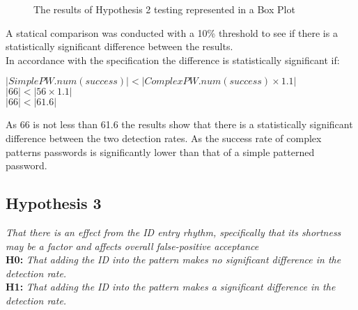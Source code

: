 \documentclass{article}
\begin{document}
\begin{figure} [H]
    \centering
    \caption{The results of Hypothesis 2 testing represented in a Box Plot}
    \label{fig:boxPlotHyp2}
\end{figure}

A statical comparison was conducted with a 10\% threshold to see if there is a statistically significant difference between the results. \\

In accordance with the specification the difference is statistically significant if: 
\begin{center}
    $ |SimplePW.num(success)| < |ComplexPW.num(success) \times 1.1|$ \\
    $ |66| < |56 \times 1.1| $ \\
    $ |66| < |61.6| $
\end{center}

As 66 is not less than 61.6 the results show that there is a statistically significant difference between the two detection rates. As the success rate of complex patterns passwords is significantly lower than that of a simple patterned password. 

\subsection{Hypothesis 3}
\begin{center}
\textit{That there is an effect from the ID entry rhythm, specifically that its shortness may be a factor and affects overall false-positive acceptance} \newline \\

\textbf{H0:} \textit{That adding the ID	into the pattern makes no significant difference in the detection	rate.} \newline \\
\textbf{H1:} \textit{That adding the ID	into the pattern makes a significant	difference in the detection	rate.} \newline \\
\end{center}
\end{document}
